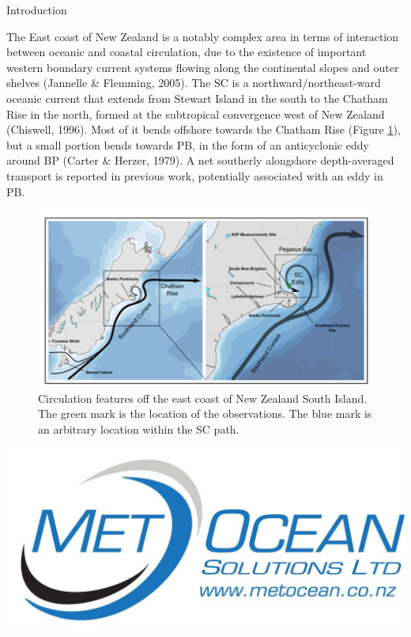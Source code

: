 \documentclass[final]{beamer}
\newlength{\onecolwid}
\begin{document}
\begin{frame}[t]
\begin{columns}[t]
\begin{column}{\onecolwid}
    \begin{block}{Introduction}

    The East coast of New Zealand is a notably complex area in terms of interaction between oceanic and coastal circulation, due to the existence of important western boundary current systems flowing along the continental slopes and outer shelves (Jannelle \& Flemming, 2005). The SC is a northward/northeast-ward oceanic current that extends from Stewart Island in the south to the Chatham Rise in the north, formed at the subtropical convergence west of New Zealand (Chiswell, 1996). Most of it bends offshore towards the Chatham Rise (Figure \ref{schematics}), but a small portion bends towards PB, in the form of an anticyclonic eddy around BP (Carter \& Herzer, 1979). A net southerly alongshore depth-averaged transport is reported in previous work, potentially associated with an eddy in PB. 
    \begin{figure}
    \includegraphics[width=1.0\linewidth]{schematics.png}
    \caption{\label{schematics} Circulation features off the east coast of New Zealand South Island. The green mark is the location of the observations. The blue mark is an arbitrary location within the SC path.}
    \end{figure}


    \end{block}

    \includegraphics[width=0.7\linewidth]{msllogo.jpg}


\end{column}
\end{columns}
\end{frame}
\end{document}
